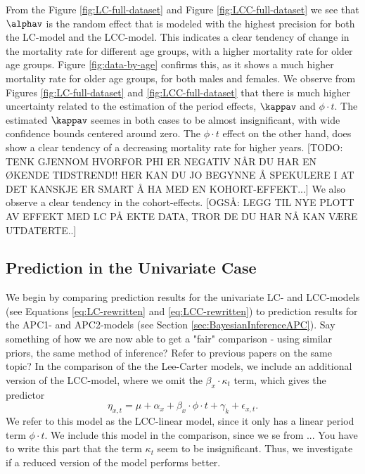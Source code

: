 \newpar From the Figure \ref{fig:LC-full-dataset} and Figure \ref{fig:LCC-full-dataset} we see that $\alphav$ is the random effect that is modeled with the highest precision for both the LC-model and the LCC-model. This indicates a clear tendency of change in the mortality rate for different age groups, with a higher mortality rate for older age groups. Figure \ref{fig:data-by-age} confirms this, as it shows a much higher mortality rate for older age groups, for both males and females. 
\newpar We observe from Figures \ref{fig:LC-full-dataset} and \ref{fig:LCC-full-dataset} that there is much higher uncertainty related to the estimation of the period effects, $\kappav$ and $\phi\cdot t$. The estimated $\kappav$ seemes in both cases to be almost insignificant, with wide confidence bounds centered around zero. The $\phi \cdot t$ effect on the other hand, does show a clear tendency of a decreasing mortality rate for higher years. [TODO: TENK GJENNOM HVORFOR PHI ER NEGATIV NÅR DU HAR EN ØKENDE TIDSTREND!! HER KAN DU JO BEGYNNE Å SPEKULERE I AT DET KANSKJE ER SMART Å HA MED EN KOHORT-EFFEKT...] We also observe a clear tendency in the cohort-effects. [OGSÅ: LEGG TIL NYE PLOTT AV EFFEKT MED LC PÅ EKTE DATA, TROR DE DU HAR NÅ KAN VÆRE UTDATERTE..]

\subsection{Prediction in the Univariate Case}
We begin by comparing prediction results for the univariate LC- and LCC-models (see Equations \ref{eq:LC-rewritten} and \ref{eq:LCC-rewritten}) to prediction results for the APC1- and APC2-models (see Section \ref{sec:BayesianInferenceAPC}).
\textcolor{myDarkGreen}{Say something of how we are now able to get a "fair" comparison - using similar priors, the same method of inference? Refer to previous papers on the same topic? }
In the comparison of the the Lee-Carter models, we include an additional version of the LCC-model, where we omit the $\beta_x\cdot \kappa_t$ term, which gives the predictor
\begin{equation}
    \eta_{x,t} = \mu + \alpha_x + \beta_x\cdot \phi \cdot t + \gamma_k + \epsilon_{x,t}.
\end{equation}
We refer to this model as the LCC-linear model, since it only has a linear period term $\phi \cdot t$. We include this model in the comparison, since we se from ... \textcolor{myDarkGreen}{You have to write this part} that the term $\kappa_t$ seem to be insignificant. Thus, we investigate if a reduced version of the model performs better. 

